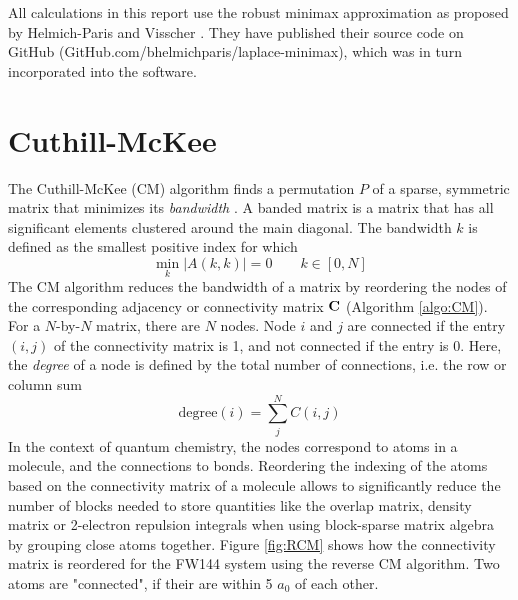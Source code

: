 All calculations in this report use the robust minimax approximation as proposed by Helmich-Paris and Visscher \cite{Hel2016}. They have published their source code on GitHub (GitHub.com/bhelmichparis/laplace-minimax), which was in turn incorporated into the \mchem{} software.

\section{Cuthill-McKee}

The Cuthill-McKee (CM) algorithm finds a permutation $P$ of a sparse, symmetric matrix that minimizes its \emph{bandwidth} \cite{Cut1969}. A banded matrix is a matrix that has all significant elements clustered around the main diagonal. The bandwidth $k$ is defined as the smallest positive index for which
\begin{equation}
\min_k \left\lvert A(k,k) \right\rvert = 0 \qquad k \in [0,N]
\end{equation}
\noindent The CM algorithm reduces the bandwidth of a matrix by reordering the nodes of the corresponding adjacency or connectivity matrix $\mathbf{C}$ (Algorithm \ref{algo:CM}). For a $N$-by-$N$ matrix, there are $N$ nodes. Node $i$ and $j$ are connected if the entry $(i,j)$ of the connectivity matrix is 1, and not connected if the entry is 0. Here, the \emph{degree} of a node is defined by the total number of connections, i.e. the row or column sum
\begin{equation}
\textrm{degree}(i) = \sum_j^N C(i,j)
\end{equation}
In the context of quantum chemistry, the nodes correspond to atoms in a molecule, and the connections to bonds. Reordering the indexing of the atoms based on the connectivity matrix of a molecule allows to significantly reduce the number of blocks needed to store quantities like the overlap matrix, density matrix or 2-electron repulsion integrals when using block-sparse matrix algebra by grouping close atoms together. Figure \ref{fig:RCM} shows how the connectivity matrix is reordered for the FW144 system using the reverse CM algorithm. Two atoms are "connected", if their are within 5 $a_0$ of each other.

